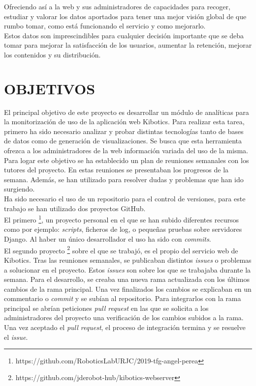 \documentclass[11pt,a4paper]{book}
\begin{document}
			Ofreciendo así a la web y sus administradores de capacidades para recoger, estudiar y valorar los datos aportados para tener una mejor visión global de que rumbo tomar, como está funcionando el servicio y como mejorarlo. \\
			
			Estos datos son imprescindibles para cualquier decisión importante que se deba tomar para mejorar la satisfacción de los usuarios, aumentar la retención, mejorar los contenidos y su distribución.
	\chapter{OBJETIVOS}
		El principal objetivo de este proyecto es desarrollar un módulo de analíticas para la monitorización de uso de la aplicación web Kibotics. Para realizar esta tarea, primero ha sido necesario analizar y probar distintas tecnologías tanto de bases de datos como de generación de visualizaciones. Se busca que esta herramienta ofrezca a los administradores de la web información variada del uso de la misma.\\
		
		Para logar este objetivo se ha establecido un plan de reuniones semanales con los tutores del proyecto. En estas reuniones se presentaban los progresos de la semana. Además, se han utilizado para resolver dudas y problemas que han ido surgiendo.\\
		
		Ha sido necesario el uso de un repositorio para el control de versiones, para este trabajo se han utilizado dos proyectos GitHub.\\
	 	
	 	El primero \footnote{https://github.com/RoboticsLabURJC/2019-tfg-angel-perea}, un proyecto personal en el que se han subido diferentes recursos como por ejemplo: \textit{scripts}, ficheros de log, o pequeñas pruebas sobre servidores Django. Al haber un único desarrollador el uso ha sido con \textit{commits}.\\
		
		El segundo proyecto \footnote{https://github.com/jderobot-hub/kibotics-webserver} sobre el que se trabajó, es el propio del servicio web de Kibotics. Tras las reuniones semanales, se publicaban distintos \textit{issues} o problemas a solucionar en el proyecto. Estos \textit{issues} son sobre los que se trabajaba durante la semana. Para el desarrollo, se creaba una nueva rama actualizada con los últimos cambios de la rama principal. Una vez finalizados los cambios se explicaban en un commentario o \textit{commit} y se subían al repositorio. Para integrarlos con la rama principal se abrían peticiones \textit{pull request} en las que se solicita a los administradores del proyecto una verificación de los cambios subidos a la rama. Una vez aceptado el \textit{pull request}, el proceso de integración termina y se resuelve el \textit{issue}.
		
\end{document}
